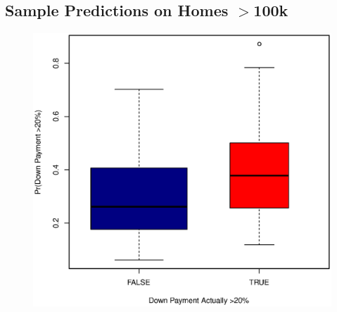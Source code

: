 \documentclass[11pt, fleqn]{article}
\begin{document}
\subsection{Sample Predictions on Homes $>$100k}

\begin{figure}[!htb]
  \centering
  \includegraphics[scale=.5]{oos_subsample_100k.eps}
  \caption{}
  \label{fig:oos_sample_gt100k}
\end{figure}
\end{document}
